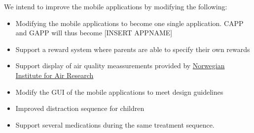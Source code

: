 We intend to improve the mobile applications by modifying the following:
\begin{itemize}
  \item Modifying the mobile applications to become one single application. CAPP and GAPP will thus become [INSERT APPNAME]
  \item Support a reward system where parents are able to specify their own rewards
  \item Support display of air quality meassurements provided by \href{http://luftkvalitet.info}{Norwegian Institute for Air Research}
  \item Modify the GUI of the mobile applications to meet design guidelines
  \item Improved distraction sequence for children
  \item Support several medications during the same treatment sequence. 
\end{itemize}

 